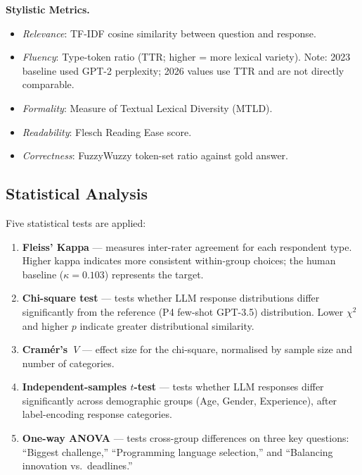 \documentclass[11pt,a4paper]{article}
\begin{document}
\medskip\noindent
\textbf{Stylistic Metrics.}
\begin{itemize}[noitemsep]
  \item \textit{Relevance}: TF-IDF cosine similarity between question and
    response.
  \item \textit{Fluency}: Type-token ratio (TTR; higher = more lexical
    variety). Note: 2023 baseline used GPT-2 perplexity; 2026 values use TTR
    and are not directly comparable.
  \item \textit{Formality}: Measure of Textual Lexical Diversity (MTLD).
  \item \textit{Readability}: Flesch Reading Ease score.
  \item \textit{Correctness}: FuzzyWuzzy token-set ratio against gold answer.
\end{itemize}

\subsection{Statistical Analysis}

Five statistical tests are applied:

\begin{enumerate}
  \item \textbf{Fleiss' Kappa} --- measures inter-rater agreement for each
    respondent type. Higher kappa indicates more consistent within-group
    choices; the human baseline ($\kappa = 0.103$) represents the target.

  \item \textbf{Chi-square test} --- tests whether LLM response distributions
    differ significantly from the reference (P4 few-shot GPT-3.5) distribution.
    Lower $\chi^2$ and higher $p$ indicate greater distributional similarity.

  \item \textbf{Cram\'{e}r's~$V$} --- effect size for the chi-square,
    normalised by sample size and number of categories.

  \item \textbf{Independent-samples $t$-test} --- tests whether LLM responses
    differ significantly across demographic groups (Age, Gender, Experience),
    after label-encoding response categories.

  \item \textbf{One-way ANOVA} --- tests cross-group differences on three key
    questions: ``Biggest challenge,'' ``Programming language selection,'' and
    ``Balancing innovation vs.\ deadlines.''
\end{enumerate}
\end{document}
